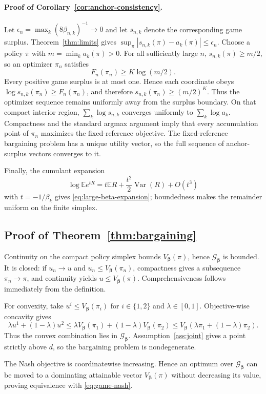 \documentclass{article}
\theoremstyle{remark}
\theoremstyle{plain}
\newcommand{\G}{\mathcal{G}}
\newcommand{\E}{\mathbb{E}}
\begin{document}
\paragraph{Proof of Corollary~\ref{cor:anchor-consistency}.}
Let $\epsilon_n=\max_k(8\beta_{n,k})^{-1}\to0$ and let $s_{n,k}$ denote the corresponding game surplus. Theorem~\ref{thm:limits} gives $\sup_\pi|s_{n,k}(\pi)-a_k(\pi)|\le\epsilon_n$. Choose a policy $\bar\pi$ with $m=\min_ka_k(\bar\pi)>0$. For all sufficiently large $n$, $s_{n,k}(\bar\pi)\ge m/2$, so an optimizer $\pi_n$ satisfies
\[
F_n(\pi_n)\ge K\log(m/2).
\]
Every positive game surplus is at most one. Hence each coordinate obeys $\log s_{n,k}(\pi_n)\ge F_n(\pi_n)$, and therefore $s_{n,k}(\pi_n)\ge(m/2)^K$. Thus the optimizer sequence remains uniformly away from the surplus boundary. On that compact interior region, $\sum_k\log s_{n,k}$ converges uniformly to $\sum_k\log a_k$. Compactness and the standard argmax argument imply that every accumulation point of $\pi_n$ maximizes the fixed-reference objective. The fixed-reference bargaining problem has a unique utility vector, so the full sequence of anchor-surplus vectors converges to it.

Finally, the cumulant expansion
\[
\log\E e^{tR}=t\E R+\frac{t^2}{2}\operatorname{Var}(R)+O(t^3)
\]
with $t=-1/\beta_k$ gives \eqref{eq:large-beta-expansion}; boundedness makes the remainder uniform on the finite simplex.

\subsection{Proof of Theorem~\ref{thm:bargaining}}
Continuity on the compact policy simplex bounds $V_{\boldsymbol\beta}(\pi)$, hence $\G_{\boldsymbol\beta}$ is bounded. It is closed: if $u_n\to u$ and $u_n\le V_{\boldsymbol\beta}(\pi_n)$, compactness gives a subsequence $\pi_n\to\pi$, and continuity yields $u\le V_{\boldsymbol\beta}(\pi)$. Comprehensiveness follows immediately from the definition.

For convexity, take $u^i\le V_{\boldsymbol\beta}(\pi_i)$ for $i\in\{1,2\}$ and $\lambda\in[0,1]$. Objective-wise concavity gives
\[
\lambda u^1+(1-\lambda)u^2
\le
\lambda V_{\boldsymbol\beta}(\pi_1)+(1-\lambda)V_{\boldsymbol\beta}(\pi_2)
\le
V_{\boldsymbol\beta}(\lambda\pi_1+(1-\lambda)\pi_2).
\]
Thus the convex combination lies in $\G_{\boldsymbol\beta}$. Assumption~\ref{ass:joint} gives a point strictly above $d$, so the bargaining problem is nondegenerate.

The Nash objective is coordinatewise increasing. Hence an optimum over $\G_{\boldsymbol\beta}$ can be moved to a dominating attainable vector $V_{\boldsymbol\beta}(\pi)$ without decreasing its value, proving equivalence with \eqref{eq:game-nash}.
\end{document}
